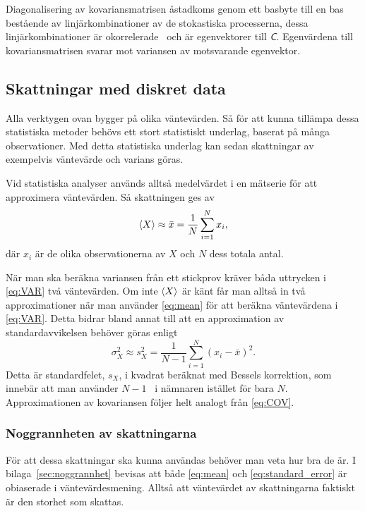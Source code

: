 Diagonalisering av kovariansmatrisen åstadkoms genom ett basbyte till en bas bestående av linjärkombinationer av de stokastiska processerna, dessa linjärkombinationer är okorrelerade~\cite{Shlens_PCA2014} och är egenvektorer till $\mathsfit{C}$. Egenvärdena till kovariansmatrisen svarar mot variansen av motsvarande egenvektor.


\subsection{Skattningar med diskret data} \label{sec:diskret_data}
Alla verktygen ovan bygger på olika väntevärden. Så för att kunna tillämpa dessa statistiska metoder behövs ett stort statistiskt underlag, baserat på många observationer. Med detta statistiska underlag kan sedan skattningar av exempelvis väntevärde och varians göras.

Vid statistiska analyser används alltså medelvärdet i en mätserie för att approximera väntevärden. Så skattningen ges av
\begin{equation}\label{eq:mean}
\ev{X} \approx \bar{x} = \frac{1}{N} \sum_{i=1}^N x_i,
\end{equation}
där $x_i$ är de olika observationerna av $X$ och $N$ dess totala antal. 

När man ska beräkna variansen från ett stickprov kräver båda uttrycken i \eqref{eq:VAR} två väntevärden. Om inte $\ev{X}$ är känt får man alltså in två approximationer när man använder \eqref{eq:mean} för att beräkna väntevärdena i \eqref{eq:VAR}. Detta bidrar bland annat till att en approximation av standardavvikelsen behöver göras enligt
\begin{equation}\label{eq:standard_error}
\sigma_X^2 \approx s_X^2
=  \frac{1}{N-1} \sum_{i=1}^N \left(x_i-\bar{x}\right)^2.
\end{equation}
Detta är standardfelet, $s_X$, i kvadrat beräknat med Bessels korrektion, som innebär att man använder $N-1$~\cite{Rice_matstat2006} i nämnaren istället för bara $N$. Approximationen av kovariansen följer helt analogt från \eqref{eq:COV}.

\subsubsection{Noggrannheten av skattningarna}
För att dessa skattningar ska kunna användas behöver man veta hur bra de är. I bilaga~\ref{sec:noggrannhet} bevisas att både \eqref{eq:mean} och \eqref{eq:standard_error} är obiaserade i väntevärdesmening. Alltså att väntevärdet av skattningarna faktiskt är den storhet som skattas.


